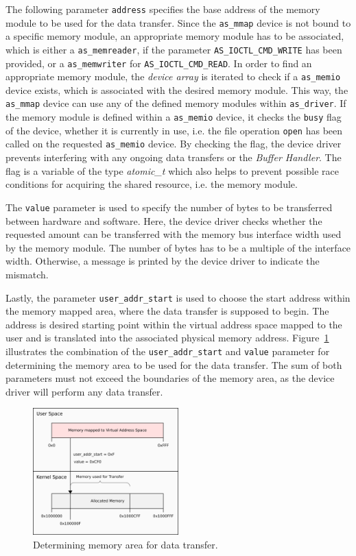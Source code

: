 The following parameter \texttt{address} specifies the base address of the memory module to be used for the data transfer.
Since the \texttt{as\_mmap} device is not bound to a specific memory module, an appropriate memory module has to be associated, which is either a \texttt{as\_memreader}, if the parameter \texttt{AS\_IOCTL\_CMD\_WRITE} has been provided, or a \texttt{as\_memwriter} for \texttt{AS\_IOCTL\_CMD\_READ}.
In order to find an appropriate memory module, the \textit{device array} is iterated to check if a \texttt{as\_memio} device exists, which is associated with the desired memory module.
This way, the \texttt{as\_mmap} device can use any of the defined memory modules within \texttt{as\_driver}.
If the memory module is defined within a \texttt{as\_memio} device, it checks the \texttt{busy} flag of the device, whether it is currently in use, i.e. the file operation \texttt{open} has been called on the requested \texttt{as\_memio} device.
By checking the flag, the device driver prevents interfering with any ongoing data transfers or the \textit{Buffer Handler}.
The flag is a variable of the type \textit{atomic\_t} which also helps to prevent possible race conditions for acquiring the shared resource, i.e. the memory module.

The \texttt{value} parameter is used to specify the number of bytes to be transferred between hardware and software.
Here, the device driver checks whether the requested amount can be transferred with the memory bus interface width used by the memory module.
The number of bytes has to be a multiple of the interface width.
Otherwise, a message is printed by the device driver to indicate the mismatch.

Lastly, the parameter \texttt{user\_addr\_start} is used to choose the start address within the memory mapped area, where the data transfer is supposed to begin.
The address is desired starting point within the virtual address space mapped to the user and is translated into the associated physical memory address.
Figure~\ref{fig:ioctl_mapping} illustrates the combination of the \texttt{user\_addr\_start} and \texttt{value} parameter for determining the memory area to be used for the data transfer.
The sum of both parameters must not exceed the boundaries of the memory area, as the device driver will perform any data transfer.

\begin{figure}[ht]
    \centering
    \includegraphics[width=0.5\textwidth,height=0.5\textheight,keepaspectratio]{figs/ioctl_mmap.png}
    \caption{Determining memory area for data transfer.}
    \label{fig:ioctl_mapping}
\end{figure}

